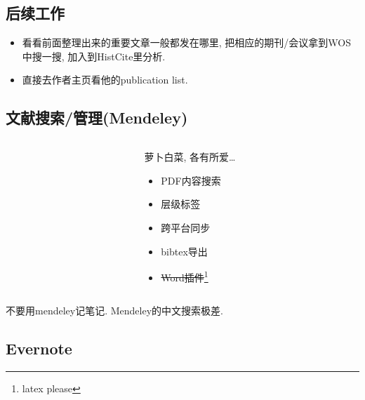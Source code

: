 \documentclass[compress]{beamer}
\begin{document}
\subsection{后续工作}

\begin{frame}{\insertsubsection}
    \begin{itemize}[<+->]
        \item 看看前面整理出来的重要文章一般都发在哪里, 把相应的期刊/会议拿到WOS中搜一搜, 加入到HistCite里分析.
        \item 直接去作者主页看他的publication list.
    \end{itemize}
\end{frame}

\subsection{文献搜索/管理(Mendeley)}

\begin{frame}{\insertsubsection}
    \begin{columns}
        \begin{column}{0.3\textwidth}
        \end{column}
        \begin{column}{0.7\textwidth}
            萝卜白菜, 各有所爱\ldots

            \pause

            \begin{itemize}[<+->]
                \item PDF内容搜索
                \item 层级标签
                \item 跨平台同步
                \item bibtex导出
                \item \sout{Word插件}\footnote{latex please}
            \end{itemize}
        \end{column}
    \end{columns}
\end{frame}

\begin{frame}{\insertsubsection}
    \begin{center}
        不要用mendeley记笔记. Mendeley的中文搜索极差.
    \end{center}
\end{frame}

\subsection{Evernote}
\end{document}
